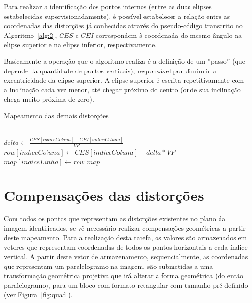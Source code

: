 Para realizar a identificação dos pontos internos (entre as duas elipses estabelecidas supervisionadamente), é possível estabelecer a relação entre as coordenadas das distorções já conhecidas através do pseudo-código transcrito no Algoritmo~\ref{alg:2}, $CES$ e $CEI$ correspondem à coordenada do mesmo ângulo na elipse superior e na elipse inferior, respectivamente.

Basicamente a operação que o algoritmo realiza é a definição de um ''passo'' (que depende da quantidade de pontos verticais), responsável por diminuir a excentricidade da elipse superior. A elipse superior é escrita repetitivamente com a inclinação cada vez menor, até chegar próximo do centro (onde sua inclinação chega muito próxima de zero).

\begin{algorithm}[htb]
    \caption{Mapeamento das demais distorções}
    \label{alg:2}
    \begin{algorithmic}[1]
      
          \\
            \State $delta \gets \frac{CES[indiceColuna] - CEI[indiceColuna]}{VP}$ \\
             \State $row[indiceColuna] \gets CES[indiceColuna] - delta * VP$
         \EndFor
        \State $map[indiceLinha] \gets row$
    \EndFor
    \State \Return  $map$
    \EndFunction
    \end{algorithmic}
\end{algorithm}

\section{Compensações das distorções}

Com todos os pontos que representam as distorções existentes no plano da imagem identificados, se vê necessário realizar compensações geométricas a partir deste mapeamento. Para a realização desta tarefa, os valores são armazenados em vetores que representam coordenadas de todos os pontos horizontais a cada índice vertical. A partir deste vetor de armazenamento, sequencialmente, as coordenadas que representam um paralelogramo na imagem, são submetidas a uma transformação geométrica projetiva que irá alterar a forma geométrica (do então paralelogramo), para um bloco com formato retangular com tamanho pré-definido (ver Figura~\ref{fig:quad}).

